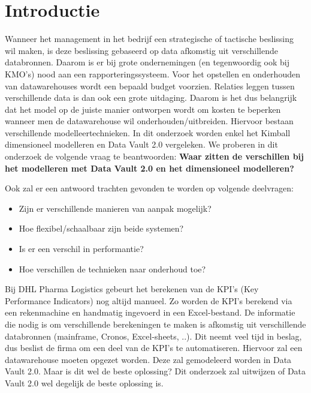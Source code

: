 
\section{Introductie} %
\label{sec:introductie}

Wanneer het management in het bedrijf een strategische of tactische beslissing wil maken, is deze beslissing gebaseerd op data afkomstig uit verschillende databronnen. Daarom is er bij grote ondernemingen (en tegenwoordig ook bij KMO’s) nood aan een rapporteringssysteem. Voor het opstellen en onderhouden van datawarehouses wordt een bepaald budget voorzien. Relaties leggen tussen verschillende data is dan ook een grote uitdaging. Daarom is het dus belangrijk dat het model op de juiste manier ontworpen wordt om kosten te beperken wanneer men de datawarehouse wil onderhouden/uitbreiden. Hiervoor bestaan verschillende modelleertechnieken. In dit onderzoek worden enkel het Kimball dimensioneel modelleren  en Data Vault 2.0 vergeleken. We proberen in dit onderzoek de volgende vraag te beantwoorden: \textbf{Waar zitten de verschillen bij het modelleren met Data Vault 2.0 en het dimensioneel modelleren?}

Ook zal er een antwoord trachten gevonden te worden op volgende deelvragen:

\begin{itemize}
	\item Zijn er verschillende manieren van aanpak mogelijk?
	\item Hoe flexibel/schaalbaar zijn beide systemen?
	\item Is er een verschil in performantie?
	\item Hoe verschillen de technieken naar onderhoud toe?
\end{itemize}

Bij DHL Pharma Logistics gebeurt het berekenen van de KPI's (Key Performance Indicators) nog altijd manueel. Zo worden de KPI's berekend via een rekenmachine en handmatig ingevoerd in een Excel-bestand. De informatie die nodig is om verschillende berekeningen te maken is afkomstig uit verschillende databronnen (mainframe, Cronos, Excel-sheets, ..). Dit neemt veel tijd in beslag, dus beslist de firma om een deel van de KPI's te automatiseren. Hiervoor zal een datawarehouse moeten opgezet worden. Deze zal gemodeleerd worden in Data Vault 2.0. Maar is dit wel de beste oplossing? Dit onderzoek zal uitwijzen of Data Vault 2.0 wel degelijk de beste oplossing is.

